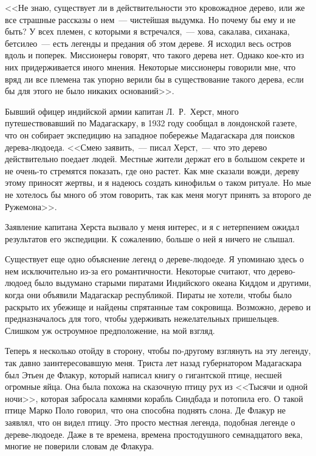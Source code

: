 \documentclass[12pt,a4paper,twoside,openany,svgnames]{memoir}
\begin{document}
<<Не знаю, существует ли в действительности это кровожадное дерево, или же все страшные рассказы о нем~--- чистейшая выдумка. Но почему бы ему и не быть? У всех племен, с которыми я встречался,~--- хова, сакалава, сиханака, бетсилео~--- есть легенды и предания об этом дереве. Я исходил весь остров вдоль и поперек. Миссионеры говорят, что такого дерева нет. Однако кое-кто из них придерживается иного мнения. Некоторые миссионеры говорили мне, что вряд ли все племена так упорно верили бы в существование такого дерева, если бы для этого не было никаких оснований>>.

Бывший офицер индийской армии капитан Л.~Р.~Херст, много путешествовавший по Мадагаскару, в 1932 году сообщал в лондонской газете, что он собирает экспедицию на западное побережье Мадагаскара для поисков дерева-людоеда. <<Смею заявить,~--- писал Херст,~--- что это дерево действительно поедает людей. Местные жители держат его в большом секрете и не очень-то стремятся показать, где оно растет. Как мне сказали вожди, дереву этому приносят жертвы, и я надеюсь создать кинофильм о таком ритуале. Но мые не хотелось бы много об этом говорить, так как меня могут принять за второго де Ружемона>>.

Заявление капитана Херста вызвало у меня интерес, и я с нетерпением ожидал результатов его экспедиции. К сожалению, больше о ней я ничего не слышал.

Существует еще одно объяснение легенд о дереве-людоеде. Я упоминаю здесь о нем исключительно из-за его романтичности. Некоторые считают, что дерево-людоед было выдумано старыми пиратами Индийского океана Киддом и другими, когда они объявили Мадагаскар республикой. Пираты не хотели, чтобы было раскрыто их убежище и найдены спрятанные там сокровища. Возможно, дерево и предназначалось для того, чтобы удерживать нежелательных пришельцев. Слишком уж остроумное предположение, на мой взгляд.

Теперь я несколько отойду в сторону, чтобы по-другому взглянуть на эту легенду, так давно заинтересовавшую меня. Триста лет назад губернатором Мадагаскара был Этьен де Флакур, который написал книгу о гигантской птице, несшей огромные яйца. Она была похожа на сказочную птицу рух из <<Тысячи и одной ночи>>, которая забросала камнями корабль Синдбада и потопила его. О такой птице Марко Поло говорил, что она способна поднять слона. Де Флакур не заявлял, что он видел птицу. Это просто местная легенда, подобная легенде о дереве-людоеде. Даже в те времена, времена простодушного семнадцатого века, многие не поверили словам де Флакура.
\end{document}
